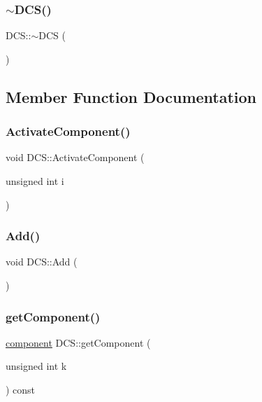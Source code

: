\subsubsection{\texorpdfstring{$\sim$\+D\+C\+S()}{~DCS()}}
{\footnotesize\ttfamily D\+C\+S\+::$\sim$\+D\+CS (\begin{DoxyParamCaption}{ }\end{DoxyParamCaption})\hspace{0.3cm}{\ttfamily [virtual]}}



\subsection{Member Function Documentation}
\mbox{\label{classDCS_a3c4c817b466389070cb7d8051c2ec38f}} 
\subsubsection{\texorpdfstring{Activate\+Component()}{ActivateComponent()}}
{\footnotesize\ttfamily void D\+C\+S\+::\+Activate\+Component (\begin{DoxyParamCaption}\item[{unsigned int}]{i }\end{DoxyParamCaption})}

\mbox{\label{classDCS_a8d3778638a4104c2c41569aca7ed17b1}} 
\subsubsection{\texorpdfstring{Add()}{Add()}}
{\footnotesize\ttfamily void D\+C\+S\+::\+Add (\begin{DoxyParamCaption}{ }\end{DoxyParamCaption})}

\mbox{\label{classDCS_af1f82450ff5c80deff0fb2d270bf6276}} 
\subsubsection{\texorpdfstring{get\+Component()}{getComponent()}}
{\footnotesize\ttfamily \hyperlink{DCS_8h_aff5561f7728e7d2c203fbfeac4a73866}{component} D\+C\+S\+::get\+Component (\begin{DoxyParamCaption}\item[{unsigned int}]{k }\end{DoxyParamCaption}) const}

